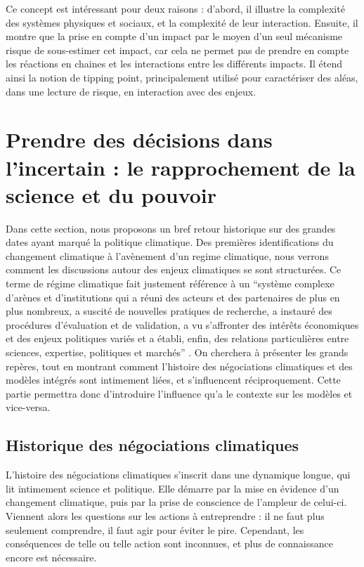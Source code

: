Ce concept est intéressant pour deux raisons : d'abord, il illustre la complexité des systèmes physiques et sociaux, et la complexité de leur interaction. Ensuite, il montre que la prise en compte d'un impact par le moyen d'un seul mécanisme risque de sous-estimer cet impact, car cela ne permet pas de prendre en compte les réactions en chaines et les interactions entre les différents impacts. Il étend ainsi la notion de tipping point, principalement utilisé pour caractériser des aléas, dans une lecture de risque, en interaction avec des enjeux. 

\section{Prendre des décisions dans l'incertain : le rapprochement de la science et du pouvoir}
\label{sect/1/2}

Dans cette section, nous proposons un bref retour historique sur des grandes dates ayant marqué la politique climatique. Des premières identifications du changement climatique à l'avènement d'un \gls{regime climatique}, nous verrons comment les discussions autour des enjeux climatiques se sont structurées. Ce terme de régime climatique fait justement référence à un  \enquote{système complexe d’arènes et d’institutions qui a réuni des acteurs et des partenaires de plus en plus nombreux, a suscité de nouvelles pratiques de recherche, a instauré des procédures d’évaluation et de validation, a vu s’affronter des intérêts économiques et des enjeux politiques variés et a établi, enfin, des relations particulières entre sciences, expertise, politiques et marchés} \autocite{aykut_gouverner_nodate}. On cherchera à présenter les grands repères, tout en montrant comment l'histoire des négociations climatiques et des modèles intégrés sont intimement liées, et s'influencent réciproquement. Cette partie permettra donc d'introduire l'influence qu'a le contexte sur les modèles et vice-versa. 


\subsection{Historique des négociations climatiques}
\label{sect:1.2.1}

L'histoire des négociations climatiques s'inscrit dans une dynamique longue, qui lit intimement science et politique. Elle démarre par la mise en évidence d'un changement climatique, puis par la prise de conscience de l'ampleur de celui-ci. Viennent alors les questions sur les actions à entreprendre : il ne faut plus seulement comprendre, il faut agir pour éviter le pire. Cependant, les conséquences de telle ou telle action sont inconnues, et plus de connaissance encore est nécessaire. \\


